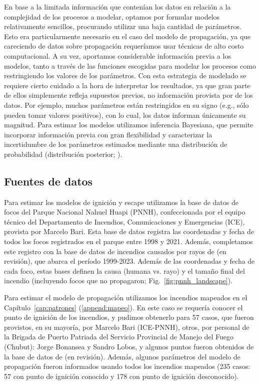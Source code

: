 En base a la limitada información que contenían los datos en relación a la complejidad de los procesos a modelar, optamos por formular modelos relativamente sencillos, procurando utilizar una baja cantidad de parámetros. Esto era particularmente necesario en el caso del modelo de propagación, ya que careciendo de datos sobre propagación requeríamos usar técnicas de alto costo computacional. A su vez, aportamos considerable información previa a los modelos, tanto a través de las funciones escogidas para modelar los procesos como restringiendo los valores de los parámetros. Con esta estrategia de modelado se requiere cierto cuidado a la hora de interpretar los resultados, ya que gran parte de ellos simplemente refleja supuestos previos, no información provista por de los datos. Por ejemplo, muchos parámetros están restringidos en su signo (e.g., sólo pueden tomar valores positivos), con lo cual, los datos informan únicamente su magnitud. Para estimar los modelos utilizamos inferencia Bayesiana, que permite incorporar información previa con gran flexibilidad y caracterizar la incertidumbre de los parámetros estimados mediante una distribución de probabilidad (distribución posterior; \citealt{gelman2013bayesian}). 

\subsection{Fuentes de datos}\label{cap4:data}

Para estimar los modelos de ignición y escape utilizamos la base de datos de focos del Parque Nacional Nahuel Huapi (PNNH), confeccionada por el equipo técnico del Departamento de Incendios, Comunicaciones y Emergencias (ICE), provista por Marcelo Bari. Esta base de datos registra las coordenadas y fecha de todos los focos registrados en el parque entre 1998 y 2021. Además, completamos este registro con la base de datos de incendios causados por rayos de \citeauthor{kitzbergerLightning} (en revisión), que abarca el período 1999-2023. Además de las coordenadas y fecha de cada foco, estas bases definen la causa (humana vs. rayo) y el tamaño final del incendio (incluyendo focos que no propagaron; Fig.~\ref{fig:pnnh_landscape}).

Para estimar el modelo de propagación utilizamos los incendios mapeados en el Capítulo~\ref{cap:patrones} (\ref{append:mapeo}). En este caso se requería conocer el punto de ignición de los incendios, y pudimos obtenerlo para 57 casos, que fueron provistos, en su mayoría, por Marcelo Bari (ICE-PNNH), otros, por personal de la Brigada de Puerto Patriada del Servicio Provincial de Manejo del Fuego (Chubut): Jorge Bonansea y Sandro Lobos, y algunos puntos fueron obtenidos de la base de datos de \citeauthor{kitzbergerLightning} (en revisión). Además, algunos parámetros del modelo de propagación fueron informados usando todos los incendios mapeados (235 casos: 57 con punto de ignición conocido y 178 con punto de ignición desconocido).

